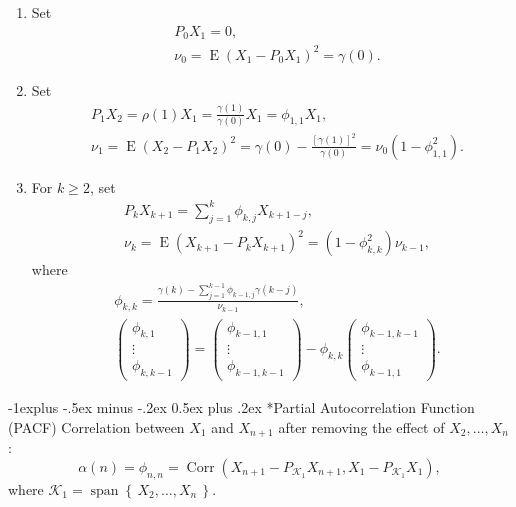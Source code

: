 \documentclass[paper=a4,fontsize=2.89mm]{scrartcl}
\makeatletter
\DeclareMathOperator{\Corr}{Corr}
\DeclareMathOperator{\E}{E}
\DeclareMathOperator{\Span}{span}
\newcommand\set[1]{\left\{\, #1 \,\right\}}
\renewcommand{\subsection}{\@startsection{subsection}{2}{0mm}%
                                {-1explus -.5ex minus -.2ex}%
                                {0.5ex plus .2ex}%
                                {\normalfont\normalsize\bfseries}}
\makeatother
\begin{document}
\begin{multicols}{3}
\begin{enumerate}
\item
Set 
\begin{align*}
&P_0X_1 = 0, \\ 
&\nu_0 = \E(X_1 - P_0X_1)^2 = \gamma(0).
\end{align*}

\item
Set 
\begin{align*}
&P_1X_2 = \rho(1)X_1 = \frac{\gamma(1)}{\gamma(0)}X_1 = \phi_{1,1}X_1, \\
&\nu_1 = \E(X_2 - P_1X_2)^2  = \gamma(0) - \frac{[\gamma(1)]^2}{\gamma(0)} = \nu_0(1- \phi_{1,1}^2).
\end{align*}

\item
For $k \ge 2$, set
\begin{align*}
&P_kX_{k+1}  = \sum_{j=1}^k \phi_{k,j}X_{k+1-j}, \\
&\nu_k = \E(X_{k+1} - P_kX_{k+1})^2 = (1 - \phi^2_{k,k})\nu_{k-1},
\end{align*}
where
\begin{align*}
&\phi_{k,k} = \frac{\gamma(k) - \sum_{j=1}^{k-1}\phi_{k-1,j}\gamma(k-j)}{\nu_{k-1}}, \\
&\begin{pmatrix} \phi_{k,1} \\ \vdots \\ \phi_{k,k-1} \end{pmatrix}
= \begin{pmatrix} \phi_{k-1,1} \\ \vdots \\ \phi_{k-1,k-1} \end{pmatrix} - \phi_{k,k}\begin{pmatrix} \phi_{k-1,k-1} \\ \vdots \\ \phi_{k-1,1} \end{pmatrix}.
\end{align*}

\end{enumerate}

\subsection*{Partial Autocorrelation Function (PACF)}
Correlation between $X_1$ and $X_{n+1}$ after removing the effect of $X_2, \dots, X_n$:
$$\alpha(n) = \phi_{n,n} = \Corr(X_{n+1} - P_{\mathcal{K}_1}X_{n+1}, X_1 - P_{\mathcal{K}_1}X_1),$$
where $\mathcal{K}_1 = \Span\set{X_2, \dots, X_n}.$



\end{multicols}
\end{document}
